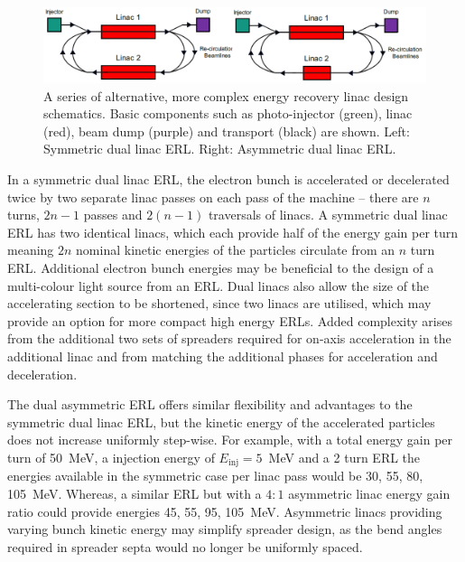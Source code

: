 \documentclass[../main.tex]{subfiles}
\begin{document}
\begin{figure}[!h]
\centering
\includegraphics[width=\textwidth]{Figures/Energy_Recovery_Linac_Design/dual_linac_ERLs.pdf}
\caption{A series of alternative, more complex energy recovery linac design schematics. Basic components such as photo-injector (green), linac (red), beam dump (purple) and transport (black) are shown. Left: Symmetric dual linac ERL. Right: Asymmetric dual linac ERL.}
\label{fig:dual_linac_ERL_designs}
\end{figure}

In a symmetric dual linac ERL, the electron bunch is accelerated or decelerated twice by two separate linac passes on each pass of the machine -- there are $n$ turns, $2n-1$ passes and $2\left(n-1\right)$ traversals of linacs. A symmetric dual linac ERL has two identical linacs, which each provide half of the energy gain per turn meaning $2n$ nominal kinetic energies of the particles circulate from an $n$ turn ERL. Additional electron bunch energies may be beneficial to the design of a multi-colour light source from an ERL. Dual linacs also allow the size of the accelerating section to be shortened, since two linacs are utilised, which may provide an option for more compact high energy ERLs. Added complexity arises from the additional two sets of spreaders required for on-axis acceleration in the additional linac and from matching the additional phases for acceleration and deceleration. 

The dual asymmetric ERL offers similar flexibility and advantages to the symmetric dual linac ERL, but the kinetic energy of the accelerated particles does not increase uniformly step-wise. For example, with a total energy gain per turn of 50~\si{\mega\electronvolt}, a injection energy of $E_{\mathrm{inj}}=5$~\si{\mega\electronvolt} and a 2 turn ERL the energies available in the symmetric case per linac pass would be 30, 55, 80, 105~\si{\mega\electronvolt}. Whereas, a similar ERL but with a $4:1$ asymmetric linac energy gain ratio could provide energies 45, 55, 95, 105~\si{\mega\electronvolt}. Asymmetric linacs providing varying bunch kinetic energy may simplify spreader design, as the bend angles required in spreader septa would no longer be uniformly spaced.
\end{document}
